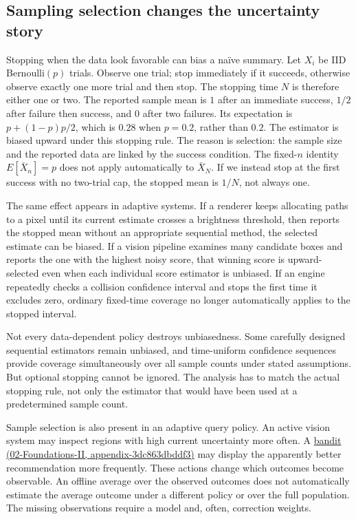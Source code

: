 \subsection{Sampling selection changes the uncertainty story}\label{03-visual-computing-i-ch012-sampling-selection-changes-the-uncertainty-story}

Stopping when the data look favorable can bias a naïve summary. Let \(X_i\) be IID Bernoulli\((p)\) trials. Observe one trial; stop immediately if it succeeds, otherwise observe exactly one more trial and then stop. The stopping time \(N\) is therefore either one or two. The reported sample mean is \(1\) after an immediate success, \(1/2\) after failure then success, and \(0\) after two failures. Its expectation is \(p+(1-p)p/2\), which is \(0.28\) when \(p=0.2\), rather than \(0.2\). The estimator is biased upward under this stopping rule. The reason is selection: the sample size and the reported data are linked by the success condition. The fixed-\(n\) identity \(E[\bar X_n]=p\) does not apply automatically to \(\bar X_N\). If we instead stop at the first success with no two-trial cap, the stopped mean is \(1/N\), not always one.

The same effect appears in adaptive systems. If a renderer keeps allocating paths to a pixel until its current estimate crosses a brightness threshold, then reports the stopped mean without an appropriate sequential method, the selected estimate can be biased. If a vision pipeline examines many candidate boxes and reports the one with the highest noisy score, that winning score is upward-selected even when each individual score estimator is unbiased. If an engine repeatedly checks a collision confidence interval and stops the first time it excludes zero, ordinary fixed-time coverage no longer automatically applies to the stopped interval.

Not every data-dependent policy destroys unbiasedness. Some carefully designed sequential estimators remain unbiased, and time-uniform confidence sequences provide coverage simultaneously over all sample counts under stated assumptions. But optional stopping cannot be ignored. The analysis has to match the actual stopping rule, not only the estimator that would have been used at a predetermined sample count.

Sample selection is also present in an adaptive query policy. An active vision system may inspect regions with high current uncertainty more often. A \href{../02-Foundations-II/main.pdf\#nameddest=appendix-3dc863dbddf3}{bandit (02-Foundations-II, appendix-3dc863dbddf3)} may display the apparently better recommendation more frequently. These actions change which outcomes become observable. An offline average over the observed outcomes does not automatically estimate the average outcome under a different policy or over the full population. The missing observations require a model and, often, correction weights.

